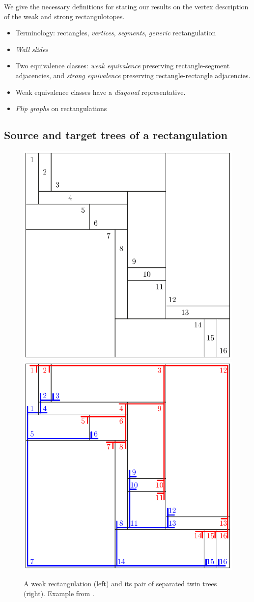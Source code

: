 \documentclass{amsart}
\theoremstyle{definition}
\newcommand{\darkblue}{\color{darkblue}} %
\newcommand{\defn}[1]{\textsl{\darkblue #1}} %
\begin{document}
We give the necessary definitions for stating our results on the vertex description of the weak and strong rectangulotopes.

\begin{itemize}
\item Terminology: rectangles, \defn{vertices}, \defn{segments}, \defn{generic} rectangulation
\item \defn{Wall slides}
\item Two equivalence classes: \defn{weak equivalence} preserving rectangle-segment adjacencies, and \defn{strong equivalence} preserving rectangle-rectangle adjacencies.
\item Weak equivalence classes have a \defn{diagonal} representative.
\item \defn{Flip graphs} on rectangulations
\end{itemize}


\subsection{Source and target trees of a rectangulation}
\label{subsec:sourceTargetTrees}


\begin{figure}
	\centerline{\includegraphics[width=.5\textwidth]{weakRectangulation} \qquad \includegraphics[width=.5\textwidth]{weakRectangulationTrees}}
	\caption{A weak rectangulation (left) and its pair of separated twin trees (right). Example from \cite{ACFF24}.}
	\label{fig:weakRectangulation}
\end{figure}
\end{document}
